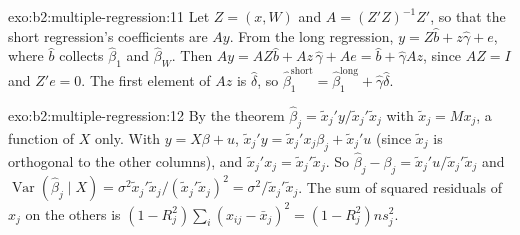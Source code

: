\begin{solution}{exo:b2:multiple-regression:11}
Let $Z = (x, W)$ and $A = (Z'Z)^{-1}Z'$, so that the short regression's coefficients are $Ay$. From the long regression,
$y = Z\hat b + z\hat\gamma + e$, where $\hat b$ collects $\hat\beta_1$ and $\hat\beta_W$. Then $Ay = AZ\hat b + Az\,\hat\gamma
+ Ae = \hat b + \hat\gamma Az$, since $AZ = I$ and $Z'e = 0$. The first element of $Az$ is $\hat\delta$, so
$\hat\beta_1^{\text{short}} = \hat\beta_1^{\text{long}} + \hat\gamma\hat\delta$.
\end{solution}

\begin{solution}{exo:b2:multiple-regression:12}
By the theorem $\hat\beta_j = \tilde x_j'y/\tilde x_j'\tilde x_j$ with $\tilde x_j = Mx_j$, a function of $X$ only. With
$y = X\beta + u$, $\tilde x_j'y = \tilde x_j'x_j\beta_j + \tilde x_j'u$ (since $\tilde x_j$ is orthogonal to the other
columns), and $\tilde x_j'x_j = \tilde x_j'\tilde x_j$. So $\hat\beta_j - \beta_j = \tilde x_j'u/\tilde x_j'\tilde x_j$ and
$\operatorname{Var}(\hat\beta_j \mid X) = \sigma^2\tilde x_j'\tilde x_j/(\tilde x_j'\tilde x_j)^2 = \sigma^2/\tilde
x_j'\tilde x_j$. The sum of squared residuals of $x_j$ on the others is $(1 - R_j^2)\sum_i(x_{ij} - \bar x_j)^2 =
(1 - R_j^2)ns_j^2$.
\end{solution}

